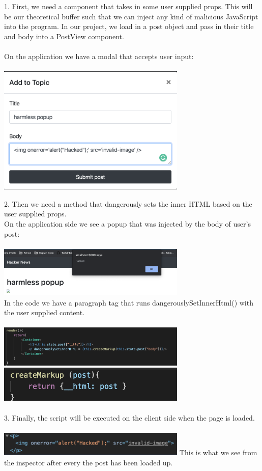 \documentclass[conference]{IEEEtran}
\begin{document}
1. First, we need a component that takes in some user supplied props. This will be our theoretical buffer such that we can inject any kind of malicious JavaScript into the program. In our project, we load in a post object and pass in their title and body into a PostView component.\\\\
On the application we have a modal that accepts user input:\\\\
\includegraphics[width = 9cm]{modal.png}

2. Then we need a method that dangerously sets the inner HTML based on the user supplied props.\\

On the application side we see a popup that was injected by the body of user's post:\\\\
\includegraphics[width = 9cm]{post.png}\\
In the code we have a paragraph tag that runs dangerouslySetInnerHtml() with the user supplied content.\\\\
\includegraphics[width= 9cm]{buffer.png}\\
\includegraphics[width = 9cm]{method.png}\\\\
3. Finally, the script will be executed on the client side when the page is loaded.\\\\
\includegraphics[width = 9cm]{inspector.png}
This is what we see from the inspector after every the post has been loaded up.
\end{document}
